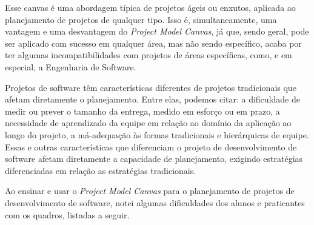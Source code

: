 \documentclass[a4]{report}
\begin{document}
Esse canvas é uma abordagem típica de projetos ágeis ou enxutos, aplicada ao planejamento de projetos de qualquer tipo. Isso é, simultaneamente, uma vantagem e uma desvantagem do \textit{Project Model Canvas}, já que, sendo geral, pode ser aplicado com sucesso em qualquer área, mas não sendo específico, acaba por ter algumas incompatibilidades com projetos de áreas específicas, como, e em especial, a Engenharia de Software.

Projetos de software têm características diferentes de projetos tradicionais que afetam diretamente o planejamento. Entre elas, podemos citar: a dificuldade de medir ou prever o tamanho da entrega, medido em esforço ou em prazo\citeauthor{mike:agile:estimating,cocomo2:manual,pressman:2019}, a necessidade de aprendizado da equipe em relação ao domínio da aplicação ao longo do projeto, a má-adequação às formas tradicionais e hierárquicas de equipe\citep{Constantine1993}. Essas e outras características que diferenciam o projeto de desenvolvimento de software afetam diretamente a capacidade de planejamento, exigindo estratégias diferenciadas em relação as estratégias tradicionais.

Ao ensinar e usar o \textit{Project Model Canvas} para o planejamento de projetos de desenvolvimento de software, notei algumas dificuldades dos alunos e praticantes com os quadros, listadas a seguir.
\end{document}
